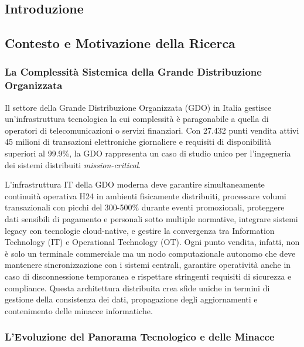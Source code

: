 \begin{refsection}
  

\chapter{Introduzione}

\section{Contesto e Motivazione della Ricerca}

\subsection{La Complessità Sistemica della Grande Distribuzione Organizzata}

Il settore della Grande Distribuzione Organizzata (GDO) in Italia gestisce un'infrastruttura tecnologica la cui complessità è paragonabile a quella di operatori di telecomunicazioni o servizi finanziari. Con 27.432 punti vendita attivi\autocite{istat_struttura_2024} 45 milioni di transazioni elettroniche giornaliere e requisiti di disponibilità superiori al 99.9\%, la GDO rappresenta un caso di studio unico per l'ingegneria dei sistemi distribuiti\textit{ mission-critical}.

L'infrastruttura IT della GDO moderna deve garantire simultaneamente continuità operativa H24 in ambienti fisicamente distribuiti, processare volumi transazionali con picchi del 300-500\% durante eventi promozionali\autocite{Osservatorio2024}, proteggere dati sensibili di pagamento e personali sotto multiple normative, integrare sistemi legacy con tecnologie cloud-native, e gestire la convergenza tra Information Technology (IT) e Operational Technology (OT). Ogni punto vendita, infatti, non è solo un terminale commerciale ma un nodo computazionale autonomo che deve mantenere sincronizzazione con i sistemi centrali, garantire operatività anche in caso di disconnessione temporanea e rispettare stringenti requisiti di sicurezza e compliance. Questa architettura distribuita crea sfide uniche in termini di gestione della consistenza dei dati, propagazione degli aggiornamenti e contenimento delle minacce informatiche.

\subsection{L'Evoluzione del Panorama Tecnologico e delle Minacce}


\end{refsection}
